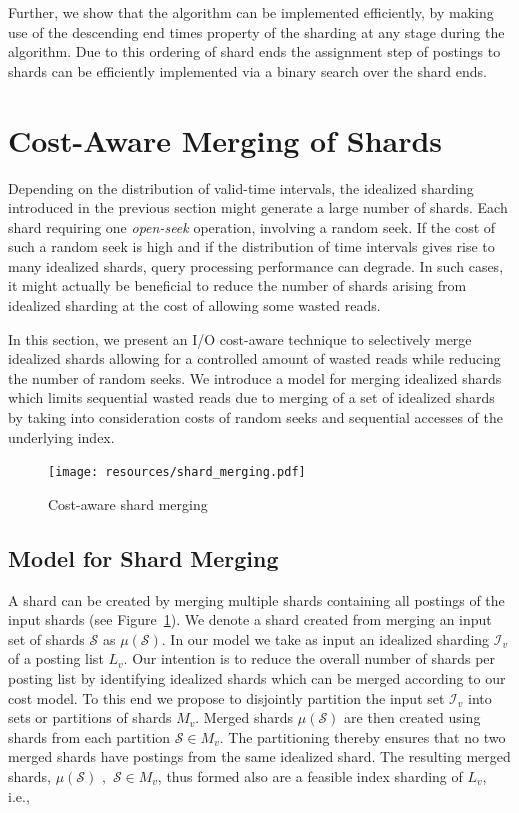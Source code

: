 Further, we show that the algorithm can be implemented efficiently, by
making use of the descending end times property of the sharding at any stage during the algorithm. Due to this ordering of shard ends the assignment step of postings to shards can be efficiently implemented via a binary search over the shard ends.

\section{Cost-Aware Merging of Shards}
\label{chap:sharding:sec:relaxed_part}

Depending on the distribution of valid-time intervals, the idealized
sharding introduced in the previous section might generate a large
number of shards. Each shard requiring one \emph{open-seek} operation, 
involving a random seek.  If the cost of such a random seek is
high and if the distribution of time intervals gives rise to many
idealized shards, query processing performance can degrade. In such 
cases, it might actually be beneficial to reduce the number of shards 
arising from idealized sharding at the cost of allowing some wasted 
reads.
 
In this section, we present an I/O cost-aware technique to
selectively merge idealized shards allowing for a controlled amount of
wasted reads while reducing the number of random seeks. We introduce a
 model for merging idealized shards which limits sequential wasted reads due to merging of a
set of idealized shards by taking into consideration costs of random
seeks and sequential accesses of the underlying index.

\begin{figure}[tb]
	\centering
		\texttt{[image: resources/shard\_merging.pdf]}
	\caption{Cost-aware shard merging}
	 \label{fig:cas}
\end{figure}
\subsection{Model for Shard Merging}

A shard can be created by merging multiple shards containing all postings of the input shards (see Figure~\ref{fig:cas}). We denote a shard created from merging an input set of shards $\mathcal{S}$ as $\mu(\mathcal{S})$. 
In our model we take as input an idealized sharding $\mathcal{I}_v$ of a posting list $L_v$. Our intention is to reduce the overall 
number of shards per posting list by identifying idealized shards which 
can be merged according to our cost model. To this end we propose to 
disjointly partition the input set $\mathcal{I}_v$ into sets or partitions of 
shards $M_v$. Merged shards $\mu(\mathcal{S})$ are then created using 
shards from each partition $\mathcal{S} \in M_v$. The partitioning 
thereby ensures that no two merged shards have postings from the same 
idealized shard. The resulting merged shards, $\mu(\mathcal{S}) \,\,, \,\, \mathcal{S} \in M_v$, thus formed also are a feasible 
index sharding of $L_v$, i.e.,

